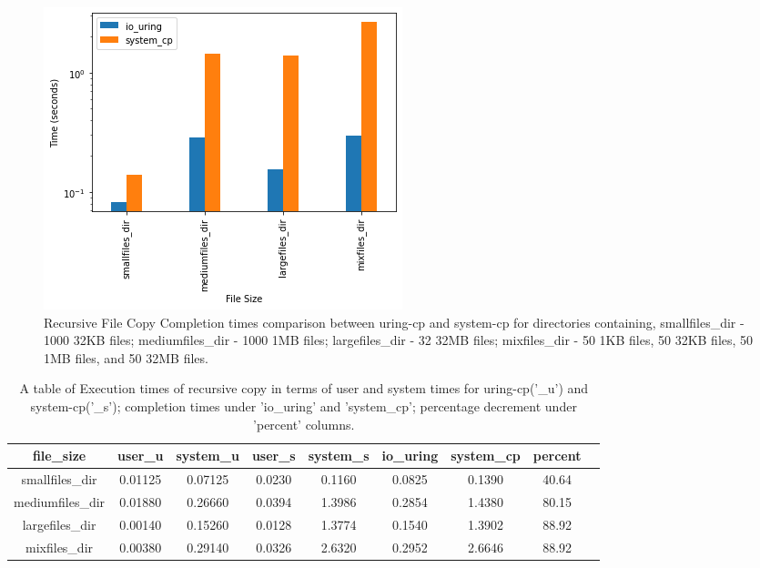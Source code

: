 \documentclass{article}
\begin{document}
\begin{figure}
    \centering
    \includegraphics[scale = 0.5]{cp_perf_recursive_compare.png}
    \caption{Recursive File Copy Completion times comparison between uring-cp and system-cp for directories containing, 
    smallfiles\_dir - 1000 32KB files; 
    mediumfiles\_dir - 1000 1MB files; 
    largefiles\_dir - 32 32MB files; 
    mixfiles\_dir - 50 1KB files, 50 32KB files, 50 1MB files, and 50 32MB files.}
    \label{Figure7}
\end{figure}

\begin{table}
\centering
\begin{tabular}{|c|c|c|c|c|c|c|c|c|}

    \hline
    file\_size & user\_u & system\_u & user\_s & system\_s & io\_uring & system\_cp & percent \\
    \hline                                                                                        
    smallfiles\_dir  &0.01125 & 0.07125& 0.0230 &  0.1160  & 0.0825 &   0.1390  &  40.64\\
    \hline                                                                                        
    mediumfiles\_dir &0.01880 & 0.26660& 0.0394 &  1.3986  & 0.2854 &   1.4380  &  80.15\\
    \hline                                                                                        
    largefiles\_dir  &0.00140 & 0.15260& 0.0128 &  1.3774  & 0.1540 &   1.3902  &  88.92\\
    \hline                                                                                        
    mixfiles\_dir    &0.00380 & 0.29140& 0.0326 &  2.6320  & 0.2952 &   2.6646  &  88.92\\
    \hline                                                                                        
     
\end{tabular}
\caption{\label{tab:widgets}A table of Execution times of recursive copy 
in terms of user and system times for uring-cp('\_u') 
and system-cp('\_s'); completion times under 'io\_uring' and 'system\_cp'; percentage decrement under 
'percent' columns.}
\vspace{0.5cm}
\end{table}
\end{document}
